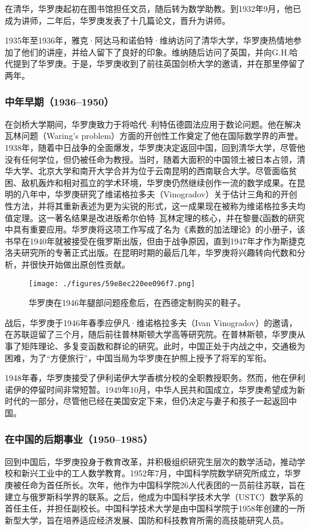在清华，华罗庚起初在图书馆担任文员，随后转为数学助教。到1932年9月，他已成为讲师，二年后，华罗庚发表了十几篇论文，晋升为讲师。

1935年至1936年，雅克·阿达马和诺伯特·维纳访问了清华大学，华罗庚热情地参加了他们的讲座，并给人留下了良好的印象。维纳随后访问了英国，并向G.H.哈代提到了华罗庚。于是，华罗庚收到了前往英国剑桥大学的邀请，并在那里停留了两年。
\subsubsection{中年早期（1936–1950）}  
在剑桥大学期间，华罗庚致力于将哈代–利特伍德圆法应用于数论问题。他在解决瓦林问题（Waring's problem）方面的开创性工作奠定了他在国际数学界的声誉。1938年，随着中日战争的全面爆发，华罗庚决定返回中国，回到清华大学，尽管他没有任何学位，但仍被任命为教授。当时，随着大面积的中国领土被日本占领，清华大学、北京大学和南开大学合并为位于云南昆明的西南联合大学。尽管面临贫困、敌机轰炸和相对孤立的学术环境，华罗庚仍然继续创作一流的数学成果。在昆明的八年中，华罗庚研究了维诺格拉多夫（Vinogradov）关于估计三角和的开创性方法，并将其重新表述为更为尖锐的形式，这一成果现在被称为维诺格拉多夫均值定理。这一著名结果是改进版希尔伯特–瓦林定理的核心，并在黎曼ζ函数的研究中具有重要应用。华罗庚将这项工作写成了名为《素数的加法理论》的小册子，该书早在1940年就被接受在俄罗斯出版，但由于战争原因，直到1947年才作为斯捷克洛夫研究所的专著正式出版。在昆明时期的最后几年，华罗庚将兴趣转向代数和分析，并很快开始做出原创性贡献。
\begin{figure}[ht]
\centering
\texttt{[image: ./figures/59e8ec220ee096f7.png]}
\caption{华罗庚在1946年腿部问题痊愈后，在西德定制购买的鞋子。} \label{fig_Luogen_2}
\end{figure}
战后，华罗庚于1946年春季应伊凡·维诺格拉多夫（Ivan Vinogradov）的邀请，在苏联逗留了三个月，随后前往普林斯顿大学高等研究院。在普林斯顿，华罗庚从事了矩阵理论、多复变函数和群论的研究。此时，中国正处于内战之中，交通极为困难，为了“方便旅行”，中国当局为华罗庚在护照上授予了将军的军衔。

1948年春，华罗庚接受了伊利诺伊大学香槟分校的全职教授职务。然而，他在伊利诺伊的停留时间非常短暂。1949年10月，中华人民共和国成立，华罗庚希望成为新时代的一部分，尽管他已经在美国安定下来，但仍决定与妻子和孩子一起返回中国。
\subsubsection{在中国的后期事业（1950–1985）}  
回到中国后，华罗庚投身于教育改革，并积极组织研究生层次的数学活动，推动学校和新兴工业中的工人数学教育。1952年7月，中国科学院数学研究所成立，华罗庚被任命为首任所长。次年，他作为中国科学院26人代表团的一员前往苏联，旨在建立与俄罗斯科学界的联系。之后，他成为中国科学技术大学（USTC）数学系的首任主任，并担任副校长。中国科学技术大学是由中国科学院于1958年创建的一所新型大学，旨在培养适应经济发展、国防和科技教育所需的高技能研究人员。

